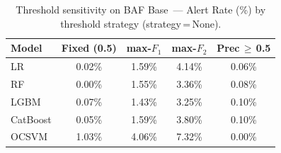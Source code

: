 \begin{table}[ht!]
\centering
\caption{Threshold sensitivity on BAF Base~--- Alert Rate (\%) by threshold strategy (strategy\,=\,None).}
\label{tab:threshold_baf_alert}
\begin{tabular}{l c c c c}
\toprule
Model & Fixed (0.5) & max-$F_1$ & max-$F_2$ & Prec\,$\geq$\,0.5 \\
\midrule
LR         & 0.02\% & 1.59\% & 4.14\% & 0.06\% \\
RF         & 0.00\% & 1.55\% & 3.36\% & 0.08\% \\
LGBM       & 0.07\% & 1.43\% & 3.25\% & 0.10\% \\
CatBoost   & 0.05\% & 1.59\% & 3.80\% & 0.10\% \\
OCSVM      & 1.03\% & 4.06\% & 7.32\% & 0.00\% \\
\bottomrule
\end{tabular}
\end{table}